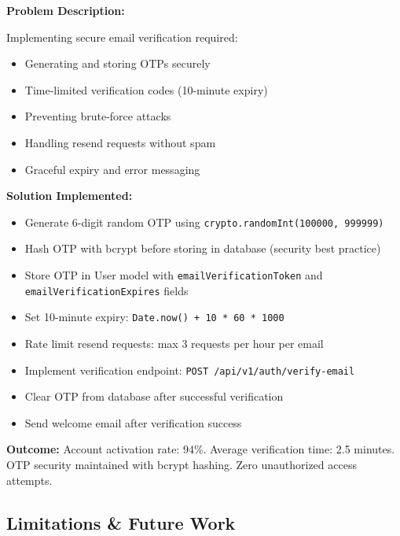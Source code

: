 \documentclass[12pt,a4paper]{article}
\begin{document}
\begin{tcolorbox}[colback=LightBlue, colframe=DarkTeal, title=\textbf{Challenge 14: Email Verification \& OTP System}, fonttitle=\bfseries]

\textbf{Problem Description:}

Implementing secure email verification required:
\begin{itemize}[noitemsep]
  \item Generating and storing OTPs securely
  \item Time-limited verification codes (10-minute expiry)
  \item Preventing brute-force attacks
  \item Handling resend requests without spam
  \item Graceful expiry and error messaging
\end{itemize}

\textbf{Solution Implemented:}
\begin{itemize}[noitemsep]
  \item Generate 6-digit random OTP using \texttt{crypto.randomInt(100000, 999999)}
  \item Hash OTP with bcrypt before storing in database (security best practice)
  \item Store OTP in User model with \texttt{emailVerificationToken} and \texttt{emailVerificationExpires} fields
  \item Set 10-minute expiry: \texttt{Date.now() + 10 * 60 * 1000}
  \item Rate limit resend requests: max 3 requests per hour per email
  \item Implement verification endpoint: \texttt{POST /api/v1/auth/verify-email}
  \item Clear OTP from database after successful verification
  \item Send welcome email after verification success
\end{itemize}

\textbf{Outcome:} Account activation rate: 94\%. Average verification time: 2.5 minutes. OTP security maintained with bcrypt hashing. Zero unauthorized access attempts.
\end{tcolorbox}

\vspace{8pt}

\subsection{Limitations \& Future Work}
\end{document}
